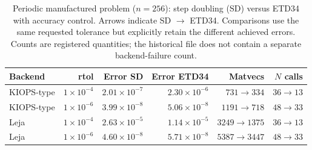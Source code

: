 \begin{table}[htbp]\centering\small
\caption{Periodic manufactured problem ($n=256$): step doubling (SD) versus ETD34 with accuracy control. Arrows indicate SD $\to$ ETD34. Comparisons use the same requested tolerance but explicitly retain the different achieved errors. Counts are registered quantities; the historical file does not contain a separate backend-failure count.}\label{tab:etd34}
\begin{tabular}{@{}lrrrrr@{}}\toprule
Backend & rtol & Error SD & Error ETD34 & Matvecs & $N$ calls\\\midrule
KIOPS-type & $1\times10^{-4}$ & $2.01\times10^{-7}$ & $2.30\times10^{-6}$ & $731\to334$ & $36\to13$ \\
KIOPS-type & $1\times10^{-6}$ & $3.99\times10^{-8}$ & $5.06\times10^{-8}$ & $1191\to718$ & $48\to33$ \\
Leja & $1\times10^{-4}$ & $2.63\times10^{-5}$ & $1.14\times10^{-5}$ & $3249\to1375$ & $36\to13$ \\
Leja & $1\times10^{-6}$ & $4.60\times10^{-8}$ & $5.71\times10^{-8}$ & $5387\to3447$ & $48\to33$ \\
\bottomrule\end{tabular}\end{table}
